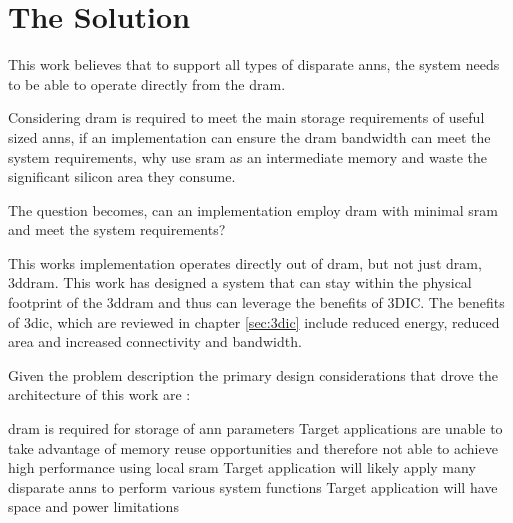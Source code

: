 \iffalse How this work addresses the problem are outlined in section \ref{chap-five}. \fi


\section[The Solution]{The Solution}
\label{sec:The Solution}

This work believes that to support all types of disparate \ac{ann}s, the system needs to be able to operate directly from the \ac{dram}.
\iffalse 
This is because SRAM-based solutions assume memory reuse when processing a \ac{ann}.
However, when \ac{ann}s do not provide sufficient reuse these solutions become \ac{dram} bandwidth bound. 
\fi

Considering \ac{dram} is required to meet the main storage requirements of useful sized \ac{ann}s, if an implementation can ensure the \ac{dram} bandwidth can meet the system requirements, why use \ac{sram} as an intermediate memory and waste the significant silicon area they consume.

The question becomes, can an implementation employ \ac{dram} with minimal \ac{sram} and meet the system requirements?

This works implementation operates directly out of \ac{dram}, but not just \ac{dram}, \ac{3ddram}.
This work has designed a system that can stay within the physical footprint of the \ac{3ddram} and thus can leverage the benefits of 3DIC.
The benefits of \ac{3dic}, which are reviewed in chapter \ref{sec:3dic} include reduced energy, reduced area and increased connectivity and bandwidth.

\iffalse
Therefore, this work is able to propose a custom 3D-\ac{dram} that exposes more of the \ac{dram}s internal page and thus generates interface bandwidth that is of the order of 64 times that of the standard \ac{3ddram}.
\fi

Given the problem description \iffalse outlined in section \ref{sec:The Problem},\fi the primary design considerations that drove the architecture of this work are :
\begin{outline}
  \1 \ac{dram} is required for storage of \ac{ann} parameters 
  \1 Target applications are unable to take advantage of memory reuse opportunities and therefore not able to achieve high performance using local \ac{sram} \iffalse to store \ac{ann} parameters or the \ac{ann} input \fi
  \1 Target application will likely apply many disparate \acp{ann} to perform various system functions
  \1 Target application will have space and power limitations
\end{outline}

